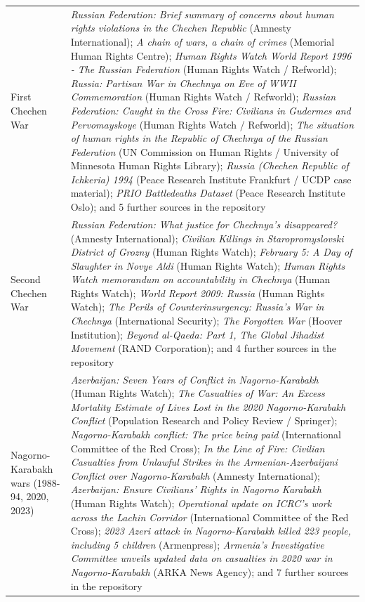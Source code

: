 \documentclass[11pt]{article}
\begin{document}
\begin{scriptsize}
\begin{longtable}{p{3.5cm} p{12.5cm}}
First Chechen War & \emph{Russian Federation: Brief summary of concerns about human rights violations in the Chechen Republic} (Amnesty International); \emph{A chain of wars, a chain of crimes} (Memorial Human Rights Centre); \emph{Human Rights Watch World Report 1996 - The Russian Federation} (Human Rights Watch / Refworld); \emph{Russia: Partisan War in Chechnya on Eve of WWII Commemoration} (Human Rights Watch / Refworld); \emph{Russian Federation: Caught in the Cross Fire: Civilians in Gudermes and Pervomayskoye} (Human Rights Watch / Refworld); \emph{The situation of human rights in the Republic of Chechnya of the Russian Federation} (UN Commission on Human Rights / University of Minnesota Human Rights Library); \emph{Russia (Chechen Republic of Ichkeria) 1994} (Peace Research Institute Frankfurt / UCDP case material); \emph{PRIO Battledeaths Dataset} (Peace Research Institute Oslo); and 5 further sources in the repository \\
\addlinespace
Second Chechen War & \emph{Russian Federation: What justice for Chechnya’s disappeared?} (Amnesty International); \emph{Civilian Killings in Staropromyslovski District of Grozny} (Human Rights Watch); \emph{February 5: A Day of Slaughter in Novye Aldi} (Human Rights Watch); \emph{Human Rights Watch memorandum on accountability in Chechnya} (Human Rights Watch); \emph{World Report 2009: Russia} (Human Rights Watch); \emph{The Perils of Counterinsurgency: Russia’s War in Chechnya} (International Security); \emph{The Forgotten War} (Hoover Institution); \emph{Beyond al-Qaeda: Part 1, The Global Jihadist Movement} (RAND Corporation); and 4 further sources in the repository \\
\addlinespace
Nagorno-Karabakh wars (1988-94, 2020, 2023) & \emph{Azerbaijan: Seven Years of Conflict in Nagorno-Karabakh} (Human Rights Watch); \emph{The Casualties of War: An Excess Mortality Estimate of Lives Lost in the 2020 Nagorno-Karabakh Conflict} (Population Research and Policy Review / Springer); \emph{Nagorno-Karabakh conflict: The price being paid} (International Committee of the Red Cross); \emph{In the Line of Fire: Civilian Casualties from Unlawful Strikes in the Armenian-Azerbaijani Conflict over Nagorno-Karabakh} (Amnesty International); \emph{Azerbaijan: Ensure Civilians' Rights in Nagorno Karabakh} (Human Rights Watch); \emph{Operational update on ICRC's work across the Lachin Corridor} (International Committee of the Red Cross); \emph{2023 Azeri attack in Nagorno-Karabakh killed 223 people, including 5 children} (Armenpress); \emph{Armenia's Investigative Committee unveils updated data on casualties in 2020 war in Nagorno-Karabakh} (ARKA News Agency); and 7 further sources in the repository \\

\end{longtable}
\end{scriptsize}
\end{document}
